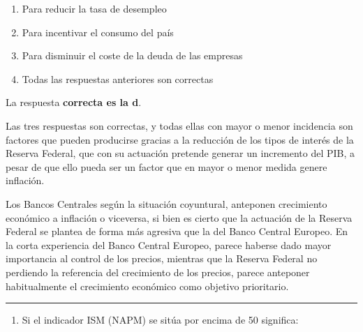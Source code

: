 \documentclass[
  letterpaper,
  DIV=11,
  numbers=noendperiod]{scrreprt}
\providecommand{\tightlist}{%
  \setlength{\itemsep}{0pt}\setlength{\parskip}{0pt}}\usepackage{longtable,booktabs,array}
\begin{document}
\begin{enumerate}
\def\labelenumi{\alph{enumi})}
\item
  Para reducir la tasa de desempleo
\item
  Para incentivar el consumo del país
\item
  Para disminuir el coste de la deuda de las empresas
\item
  Todas las respuestas anteriores son correctas
\end{enumerate}

\begin{tcolorbox}[enhanced jigsaw, left=2mm, opacityback=0, colback=white, breakable, arc=.35mm, bottomrule=.15mm, rightrule=.15mm, toprule=.15mm, leftrule=.75mm, colframe=quarto-callout-tip-color-frame]
\begin{minipage}[t]{5.5mm}
\textcolor{quarto-callout-tip-color}{\faLightbulb}
\end{minipage}%
\begin{minipage}[t]{\textwidth - 5.5mm}

La respuesta \textbf{correcta es la d}.

Las tres respuestas son correctas, y todas ellas con mayor o menor
incidencia son factores que pueden producirse gracias a la reducción de
los tipos de interés de la Reserva Federal, que con su actuación
pretende generar un incremento del PIB, a pesar de que ello pueda ser un
factor que en mayor o menor medida genere inflación.

Los Bancos Centrales según la situación coyuntural, anteponen
crecimiento económico a inflación o viceversa, si bien es cierto que la
actuación de la Reserva Federal se plantea de forma más agresiva que la
del Banco Central Europeo. En la corta experiencia del Banco Central
Europeo, parece haberse dado mayor importancia al control de los
precios, mientras que la Reserva Federal no perdiendo la referencia del
crecimiento de los precios, parece anteponer habitualmente el
crecimiento económico como objetivo prioritario.

\end{minipage}%
\end{tcolorbox}

\begin{center}\rule{0.5\linewidth}{0.5pt}\end{center}

\begin{enumerate}
\def\labelenumi{\arabic{enumi}.}
\setcounter{enumi}{21}
\tightlist
\item
  Si el indicador ISM (NAPM) se sitúa por encima de 50 significa:
\end{enumerate}
\end{document}
